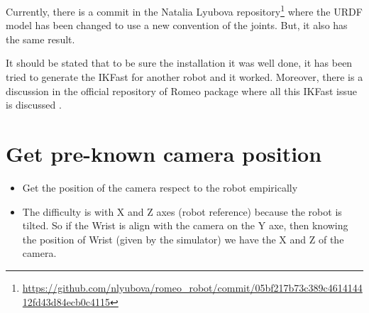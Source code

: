 \documentclass[12pt,a4paper,final,twoside,openright]{report}
\begin{document}
Currently, there is a commit in the Natalia Lyubova repository\footnote{\url{https://github.com/nlyubova/romeo_robot/commit/05bf217b73c389c461414412fd43d84ecb0c4115}} where the URDF model has been changed to use a new convention of the joints. But, it also has the same result. 

It should be stated that to be sure the installation it was well done, it has been tried to generate the IKFast for another robot and it worked. Moreover, there is a discussion in the official repository of Romeo package where all this IKFast issue is discussed \cite{romeoRobotIssue}. 

\section{Get pre-known camera position}
\begin{itemize}
\item Get the position of the camera respect to the robot empirically
\item The difficulty is with X and Z axes (robot reference) because the robot is tilted. So if the Wrist is align with the camera on the Y axe, then knowing the position of Wrist (given by the simulator) we have the X and Z of the camera.
\end{itemize}
\end{document}

